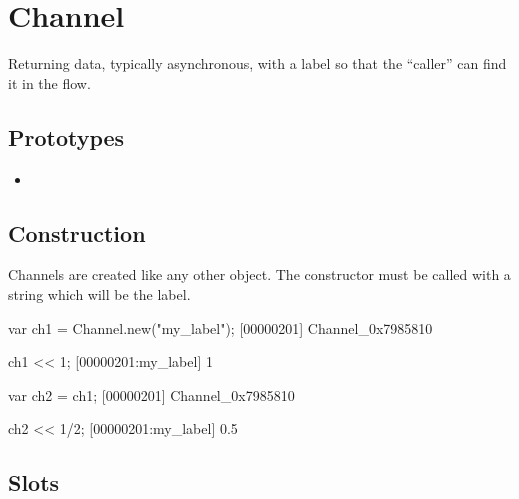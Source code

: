 \section{Channel}
Returning data, typically asynchronous, with a label so that the
``caller'' can find it in the flow.

\subsection{Prototypes}

\begin{itemize}
\item {}
\end{itemize}

\subsection{Construction}

Channels are created like any other object. The constructor must be
called with a string which will be the label.

\begin{urbiscript}[firstnumber=1]
var ch1 = Channel.new("my_label");
[00000201] Channel_0x7985810

ch1 << 1;
[00000201:my_label] 1

var ch2 = ch1;
[00000201] Channel_0x7985810

ch2 << 1/2;
[00000201:my_label] 0.5
\end{urbiscript}

\subsection{Slots}

